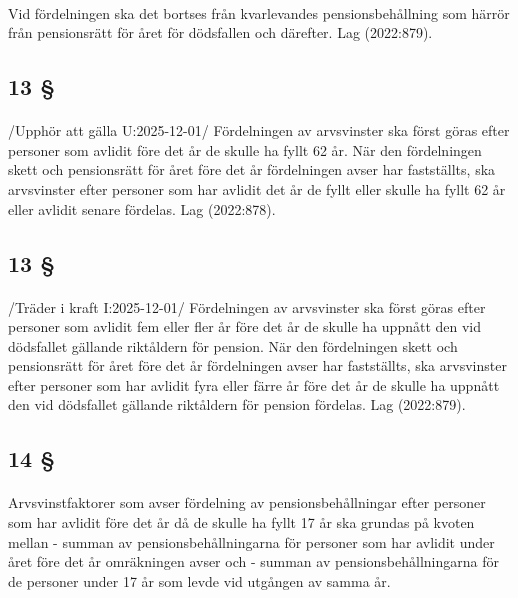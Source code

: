 \documentclass[a4paper,notitlepage,openany,10pt]{book}
\begin{document}
\paragraph*{}
Vid fördelningen ska det bortses från kvarlevandes pensionsbehållning som härrör från pensionsrätt för året för dödsfallen och därefter.
Lag (2022:879).
\subsection*{13 §}
\paragraph*{}
/Upphör att gälla U:2025-12-01/
Fördelningen av arvsvinster ska först göras efter personer som avlidit före det år de skulle ha fyllt 62 år. När den fördelningen skett och pensionsrätt för året före det år fördelningen avser har fastställts, ska arvsvinster efter personer som har avlidit det år de fyllt eller skulle ha fyllt 62 år eller avlidit senare fördelas.
Lag (2022:878).
\subsection*{13 §}
\paragraph*{}
/Träder i kraft I:2025-12-01/
Fördelningen av arvsvinster ska först göras efter personer som avlidit fem eller fler år före det år de skulle ha uppnått den vid dödsfallet gällande riktåldern för pension. När den fördelningen skett och pensionsrätt för året före det år fördelningen avser har fastställts, ska arvsvinster efter personer som har avlidit fyra eller färre år före det år de skulle ha uppnått den vid dödsfallet gällande riktåldern för pension fördelas.
Lag (2022:879).
\subsection*{14 §}
\paragraph*{}
Arvsvinstfaktorer som avser fördelning av pensionsbehållningar efter personer som har avlidit före det år då de skulle ha fyllt 17 år ska grundas på kvoten mellan
\newline - summan av pensionsbehållningarna för personer som har avlidit under året före det år omräkningen avser och
\newline - summan av pensionsbehållningarna för de personer under 17 år som levde vid utgången av samma år.
\end{document}

